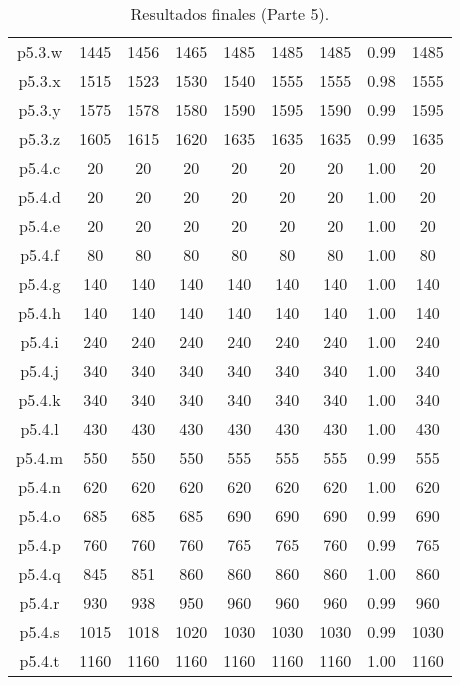 \begin{table}
\begin{center}
\begin{tabular}{ |c|c|c|c|c|c|c|c|c| }
p5.3.w & 1445 & 1456 & 1465 & 1485 & 1485 & 1485 & 0.99 & 1485  \\
p5.3.x & 1515 & 1523 & 1530 & 1540 & 1555 & 1555 & 0.98 & 1555  \\
p5.3.y & 1575 & 1578 & 1580 & 1590 & 1595 & 1590 & 0.99 & 1595  \\
p5.3.z & 1605 & 1615 & 1620 & 1635 & 1635 & 1635 & 0.99 & 1635  \\
p5.4.c & 20 & 20 & 20 & 20 & 20 & 20 & 1.00 & 20  \\
p5.4.d & 20 & 20 & 20 & 20 & 20 & 20 & 1.00 & 20  \\
p5.4.e & 20 & 20 & 20 & 20 & 20 & 20 & 1.00 & 20  \\
p5.4.f & 80 & 80 & 80 & 80 & 80 & 80 & 1.00 & 80  \\
p5.4.g & 140 & 140 & 140 & 140 & 140 & 140 & 1.00 & 140  \\
p5.4.h & 140 & 140 & 140 & 140 & 140 & 140 & 1.00 & 140  \\
p5.4.i & 240 & 240 & 240 & 240 & 240 & 240 & 1.00 & 240  \\
p5.4.j & 340 & 340 & 340 & 340 & 340 & 340 & 1.00 & 340  \\
p5.4.k & 340 & 340 & 340 & 340 & 340 & 340 & 1.00 & 340  \\
p5.4.l & 430 & 430 & 430 & 430 & 430 & 430 & 1.00 & 430  \\
p5.4.m & 550 & 550 & 550 & 555 & 555 & 555 & 0.99 & 555  \\
p5.4.n & 620 & 620 & 620 & 620 & 620 & 620 & 1.00 & 620  \\
p5.4.o & 685 & 685 & 685 & 690 & 690 & 690 & 0.99 & 690  \\
p5.4.p & 760 & 760 & 760 & 765 & 765 & 760 & 0.99 & 765  \\
p5.4.q & 845 & 851 & 860 & 860 & 860 & 860 & 1.00 & 860  \\
p5.4.r & 930 & 938 & 950 & 960 & 960 & 960 & 0.99 & 960  \\
p5.4.s & 1015 & 1018 & 1020 & 1030 & 1030 & 1030 & 0.99 & 1030  \\
p5.4.t & 1160 & 1160 & 1160 & 1160 & 1160 & 1160 & 1.00 & 1160  \\
\hline
\end{tabular}
\end{center}
\caption{Resultados finales (Parte 5).}
\label{tab:resultadosFinales5}
\end{table}



